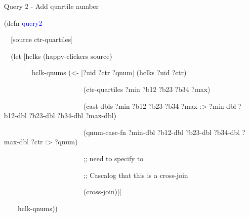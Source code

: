 \documentclass{beamer}
\begin{document}
\begin{frame}{Query 2 - Add quartile number}
\begin{small}

{\ttfamily\color{black}
\textcolor[rgb]{0.54901963,0.54901963,0.54901963}{(}\textcolor[rgb]{0.49803922,0.0,0.49803922}{defn}
\textcolor{blue}{query2}}

{\ttfamily\color{black}
\ \ [source ctr-quartiles]}

{\ttfamily\color{black}
\ \ \textcolor[rgb]{0.54901963,0.54901963,0.54901963}{(}\textcolor[rgb]{0.49803922,0.0,0.49803922}{let}
[hclks
\textcolor[rgb]{0.54901963,0.54901963,0.54901963}{(}happy-clickers
source\textcolor[rgb]{0.54901963,0.54901963,0.54901963}{)}}

{\ttfamily\color{black}
\ \ \ \ \ \ \ \ hclk-qnums
\textcolor[rgb]{0.54901963,0.54901963,0.54901963}{(}{\textless}- [?uid
?ctr ?qnum] \textcolor[rgb]{0.54901963,0.54901963,0.54901963}{(}hclks
?uid ?ctr\textcolor[rgb]{0.54901963,0.54901963,0.54901963}{)}}

{\ttfamily\color{black}
\ \ \ \ \ \ \ \ \ \ \ \ \ \ \ \ \ \ \ \ \ \ \ \textcolor[rgb]{0.54901963,0.54901963,0.54901963}{(}ctr-quartiles
?min ?b12 ?b23 ?b34
?max\textcolor[rgb]{0.54901963,0.54901963,0.54901963}{)}}

{\ttfamily\color{black}
\ \ \ \ \ \ \ \ \ \ \ \ \ \ \ \ \ \ \ \ \ \ \ \textcolor[rgb]{0.54901963,0.54901963,0.54901963}{(}cast-dbls
?min ?b12 ?b23 ?b34 ?max
\textcolor[rgb]{0.0,0.54509807,0.54509807}{:{\textgreater}} ?min-dbl
?b12-dbl ?b23-dbl ?b34-dbl
?max-dbl\textcolor[rgb]{0.54901963,0.54901963,0.54901963}{)}}

{\ttfamily\color{black}
\ \ \ \ \ \ \ \ \ \ \ \ \ \ \ \ \ \ \ \ \ \ \ \textcolor[rgb]{0.54901963,0.54901963,0.54901963}{(}qnum-casc-fn
?min-dbl ?b12-dbl ?b23-dbl ?b34-dbl ?max-dbl ?ctr
\textcolor[rgb]{0.0,0.54509807,0.54509807}{:{\textgreater}}
?qnum\textcolor[rgb]{0.54901963,0.54901963,0.54901963}{)}}

{\ttfamily\color{black}
\ \ \ \ \ \ \ \ \ \ \ \ \ \ \ \ \ \ \ \ \ \ \ \textcolor[rgb]{0.69803923,0.13333334,0.13333334}{;;
  need to specify to}}

{\ttfamily\color{black}
\ \ \ \ \ \ \ \ \ \ \ \ \ \ \ \ \ \ \ \ \ \ \ \textcolor[rgb]{0.69803923,0.13333334,0.13333334}{;;
Cascalog that this is a cross-join}}

{\ttfamily\color{black}
\ \ \ \ \ \ \ \ \ \ \ \ \ \ \ \ \ \ \ \ \ \ \ \textcolor[rgb]{0.54901963,0.54901963,0.54901963}{(}cross-join\textcolor[rgb]{0.54901963,0.54901963,0.54901963}{))}]}

{\ttfamily\color{black}
\ \ \ \ hclk-qnums\textcolor[rgb]{0.54901963,0.54901963,0.54901963}{))}}

\end{small}
\end{frame}
\end{document}
